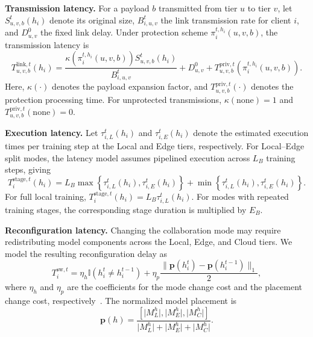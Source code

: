 \documentclass[5p,times]{elsarticle}
\theoremstyle{plain}
\theoremstyle{definition}
\theoremstyle{remark}
\begin{document}
\textbf{Transmission latency.}
For a payload \(b\) transmitted from tier \(u\)
to tier \(v\), let \(S_{u,v,b}^t(h_i)\) denote
its original size, \(B_{i,u,v}^t\) the link
transmission rate for client \(i\), and
\(D_{u,v}^{0}\) the fixed link delay.
Under protection scheme
\(\pi_i^{t,h_i}(u,v,b)\), the transmission
latency is
\begin{equation}
T_{u,v,b}^{\mathrm{link},t}(h_i)
=
\frac{
\kappa\!\left(\pi_i^{t,h_i}(u,v,b)\right)
S_{u,v,b}^t(h_i)}
{B_{i,u,v}^t}
+
D_{u,v}^{0}
+
T_{u,v,b}^{\mathrm{priv},t}
\!\left(\pi_i^{t,h_i}(u,v,b)\right).
\label{eq:comm_latency}
\end{equation}
Here, \(\kappa(\cdot)\) denotes the payload
expansion factor, and
\(T_{u,v,b}^{\mathrm{priv},t}(\cdot)\)
denotes the protection processing time.
For unprotected transmissions,
\(\kappa(\mathrm{none})=1\) and
\(T_{u,v,b}^{\mathrm{priv},t}(\mathrm{none})=0\).

\textbf{Execution latency.}
Let \(\tau_{i,L}^t(h_i)\) and
\(\tau_{i,E}^t(h_i)\) denote the estimated
execution times per training step at the
Local and Edge tiers, respectively.
For Local--Edge split modes, the latency
model assumes pipelined execution across
\(L_B\) training steps, giving
\begin{equation}
T_i^{\mathrm{stage},t}(h_i)
=
L_B\max\!\left\{
\tau_{i,L}^t(h_i),\tau_{i,E}^t(h_i)
\right\}
+
\min\!\left\{
\tau_{i,L}^t(h_i),\tau_{i,E}^t(h_i)
\right\}.
\label{eq:execution_latency}
\end{equation}
For full local training,
\(T_i^{\mathrm{stage},t}(h_i)
=L_B\tau_{i,L}^t(h_i)\).
For modes with repeated training stages,
the corresponding stage duration is
multiplied by \(E_B\).

\textbf{Reconfiguration latency.}
Changing the collaboration mode may require
redistributing model components across the
Local, Edge, and Cloud tiers.
We model the resulting reconfiguration delay as
\begin{equation}
T_i^{\mathrm{sw},t}
=
\eta_h \mathbb{I}(h_i^t\neq h_i^{t-1})
+
\eta_p
\frac{
\|\mathbf{p}(h_i^t)-\mathbf{p}(h_i^{t-1})\|_1
}{2},
\label{eq:switching_cost}
\end{equation}
where \(\eta_h\) and \(\eta_p\) are the coefficients for the mode change cost and the placement change cost, respectively~\cite{CHEN2026112204,li2026latency}. The normalized model placement is
\begin{equation}
\mathbf{p}(h)
=
\frac{
\left[
\lvert M_L^{h}\rvert,
\lvert M_E^{h}\rvert,
\lvert M_C^{h}\rvert
\right]
}{
\lvert M_L^{h}\rvert+
\lvert M_E^{h}\rvert+
\lvert M_C^{h}\rvert
}.
\label{eq:model_placement_vector}
\end{equation}
\end{document}
